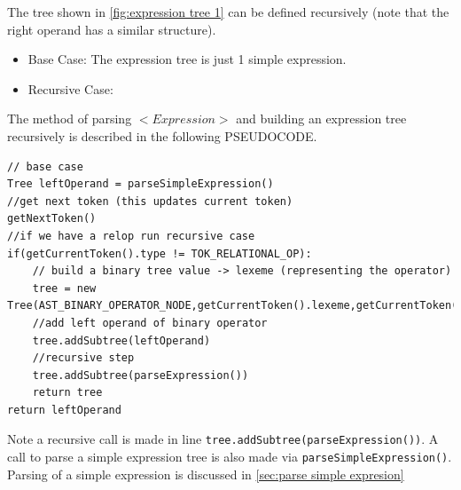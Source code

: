 The tree shown in \ref{fig:expression tree 1} can be defined recursively (note that the right operand has a similar structure).
\begin{itemize}
    \item Base Case: The expression tree is just 1 simple expression.
   \begin{center}
   \end{center}
    \item Recursive Case:
    \begin{center}
    \end{center}
\end{itemize}

The method of parsing $<Expression>$ and building an expression tree recursively is described in the following PSEUDOCODE.
\begin{lstlisting}[caption=PSEUDOCODE : parsing \emph{<Expression>} and building an expression tree (\emph{parseExpression()})]
// base case
Tree leftOperand = parseSimpleExpression()
//get next token (this updates current token) 
getNextToken()
//if we have a relop run recursive case
if(getCurrentToken().type != TOK_RELATIONAL_OP):
    // build a binary tree value -> lexeme (representing the operator)
    tree = new Tree(AST_BINARY_OPERATOR_NODE,getCurrentToken().lexeme,getCurrentToken().lineNumber)
    //add left operand of binary operator
    tree.addSubtree(leftOperand)
    //recursive step
    tree.addSubtree(parseExpression())
    return tree
return leftOperand
\end{lstlisting}
Note a recursive call is made in line \verb!tree.addSubtree(parseExpression())!. A call to parse a simple expression tree is also made via \verb!parseSimpleExpression()!. Parsing of a simple expression is discussed in \ref{sec:parse simple expresion}




